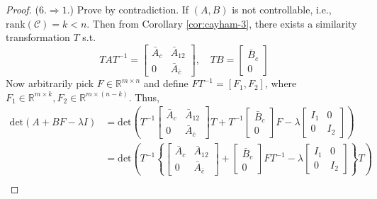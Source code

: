 \documentclass[
]{book}
\theoremstyle{definition}
\theoremstyle{definition}
\theoremstyle{definition}
\theoremstyle{definition}
\theoremstyle{remark}
\begin{document}
\begin{proof}
(\(6. \Rightarrow 1.\)) Prove by contradiction. If \((A, B)\) is not controllable, i.e., \(\text{rank}(\mathcal{C}) = k < n\). Then from Corollary \ref{cor:cayham-3}, there exists a similarity transformation \(T\) s.t.
\begin{equation*}
   TAT^{-1} = \begin{bmatrix}
      \bar{A}_c & \bar{A}_{12} \\
      0 & \bar{A}_{\bar{c}}
   \end{bmatrix}, \quad TB = \begin{bmatrix}
      \bar{B}_c \\
      0
   \end{bmatrix}
\end{equation*}
Now arbitrarily pick \(F \in \mathbb{R}^{m\times n}\) and define \(FT^{-1} = [F_1, F_2]\), where \(F_1 \in \mathbb{R}^{m\times k}, F_2 \in \mathbb{R}^{m\times (n-k)}\). Thus,
\begin{equation*}
   \begin{split}
      \text{det}(A+BF-\lambda I) & = \text{det}\left(
         T^{-1} \begin{bmatrix}
            \bar{A}_c & \bar{A}_{12} \\
            0 & \bar{A}_{\bar{c}}
         \end{bmatrix} T + T^{-1} \begin{bmatrix}
            \bar{B}_c \\ 0
         \end{bmatrix} F - \lambda \begin{bmatrix}
            I_1 & 0 \\
            0 & I_2
         \end{bmatrix}
      \right) \\
      & = \text{det}\left(
         T^{-1} \left\{
            \begin{bmatrix}
               \bar{A}_c & \bar{A}_{12} \\
               0 & \bar{A}_{\bar{c}}
            \end{bmatrix} + \begin{bmatrix}
               \bar{B}_c \\ 0
            \end{bmatrix} FT^{-1} - \lambda \begin{bmatrix}
               I_1 & 0 \\
               0 & I_2
            \end{bmatrix}
         \right\} T
      \right) \\

\end{split}
\end{equation*}
\end{proof}
\end{document}

